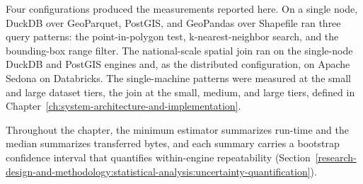 
Four configurations produced the measurements reported here. On a single node, DuckDB over GeoParquet, PostGIS, and GeoPandas over Shapefile ran three query patterns: the point-in-polygon test, k-nearest-neighbor search, and the bounding-box range filter. The national-scale spatial join ran on the single-node DuckDB and PostGIS engines and, as the distributed configuration, on Apache Sedona on Databricks. The single-machine patterns were measured at the small and large dataset tiers, the join at the small, medium, and large tiers, defined in Chapter~\ref{ch:system-architecture-and-implementation}.

Throughout the chapter, the minimum estimator summarizes run-time and the median summarizes transferred bytes, and each summary carries a bootstrap confidence interval that quantifies within-engine repeatability (Section~\ref{research-design-and-methodology:statistical-analysis:uncertainty-quantification}).





